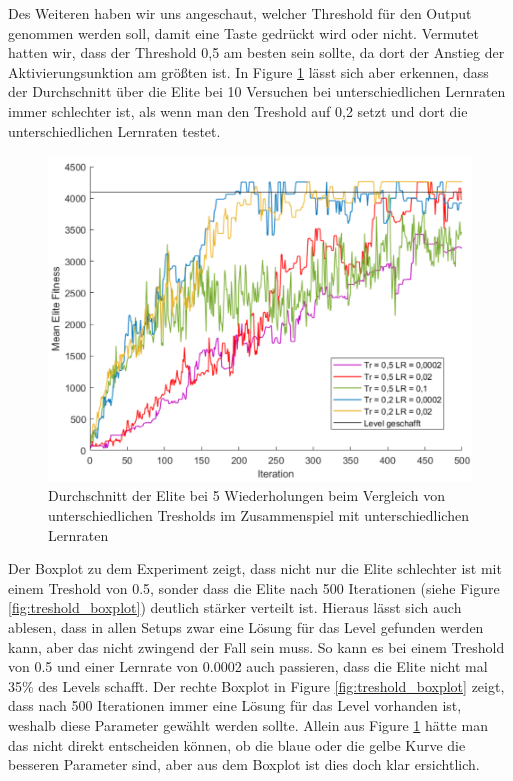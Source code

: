 \documentclass{hbrs-ecta-report}
\begin{document}
Des Weiteren haben wir uns angeschaut,  welcher Threshold für den Output genommen werden soll, damit eine Taste gedrückt wird oder nicht. Vermutet hatten wir, dass der Threshold 0,5 am besten sein sollte, da dort der Anstieg der Aktivierungsunktion am größten ist. In Figure \ref{fig:treshold} lässt sich aber erkennen, dass der Durchschnitt über die Elite bei 10 Versuchen bei unterschiedlichen Lernraten immer schlechter ist, als wenn man den Treshold auf 0,2 setzt und dort die unterschiedlichen Lernraten testet. 
\begin{figure}[h!]
	\centering
	\includegraphics[width=\linewidth]{img/Mario_Treshold.png}
	\caption{Durchschnitt der Elite bei 5 Wiederholungen beim Vergleich von unterschiedlichen Tresholds im Zusammenspiel mit unterschiedlichen Lernraten}
	\label{fig:treshold} 
\end{figure}

Der Boxplot zu dem Experiment zeigt, dass nicht nur die Elite schlechter ist mit einem Treshold von 0.5, sonder dass die Elite nach 500 Iterationen (siehe Figure \ref{fig:treshold_boxplot}) deutlich stärker verteilt ist. Hieraus lässt sich auch ablesen, dass in allen Setups zwar eine Lösung für das Level gefunden werden kann, aber das nicht zwingend der Fall sein muss. So kann es bei einem Treshold von 0.5 und einer Lernrate von 0.0002 auch passieren, dass die Elite nicht mal 35\% des Levels schafft. Der rechte Boxplot in Figure \ref{fig:treshold_boxplot} zeigt, dass nach 500 Iterationen immer eine Lösung für das Level vorhanden ist, weshalb diese Parameter gewählt werden sollte. Allein aus Figure \ref{fig:treshold} hätte man das nicht direkt entscheiden können, ob die blaue oder die gelbe Kurve die besseren Parameter sind, aber aus dem Boxplot ist dies doch klar ersichtlich.\\
\end{document}
